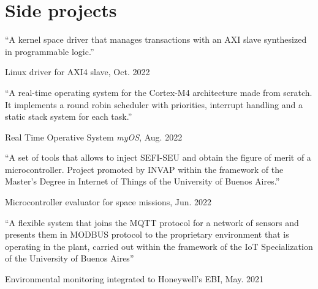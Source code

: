 \section{Side projects}

\newcommand{\pub}[5]{
	\parbox[t][][t]{\linewidth}{%
		\begin{small}
		\parbox{\linewidth}{{``#4''}}
		\smallbreak
		\parbox{\linewidth}{{#2}, {#1}}
		\parbox{\linewidth}{{\href{https://doi.org/#3}{#3}}}
		\end{small}
	}
	\bigbreak
	\smallskip
}

\pub{Oct. 2022}{Linux driver for AXI4 slave}{}{A kernel space driver that manages transactions with an AXI slave synthesized in programmable logic.}{
}

\pub{Aug. 2022}{Real Time Operative System \emph{myOS}}{}{A real-time operating system for the Cortex-M4 architecture made from scratch. It implements a round robin scheduler with priorities, interrupt handling and a static stack system for each task.}{
}

\pub{Jun. 2022}{Microcontroller evaluator for space missions}{}{A set of tools that allows to inject SEFI-SEU and obtain the figure of merit of a microcontroller. Project promoted by INVAP within the framework of the Master's Degree in Internet of Things of the University of Buenos Aires.}{
}

\pub{May. 2021}{Environmental monitoring integrated to Honeywell's EBI}{}{A flexible system that joins the MQTT protocol for a network of sensors and presents them in MODBUS protocol to the proprietary environment that is operating in the plant, carried out within the framework of the IoT Specialization of the University of Buenos Aires}{
}


